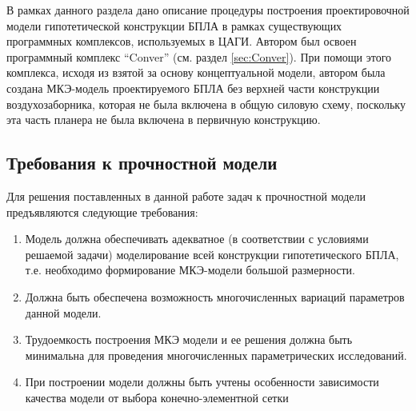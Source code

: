 
В рамках данного раздела дано описание процедуры построения проектировочной модели гипотетической конструкции БПЛА в рамках существующих программных комплексов, используемых в ЦАГИ. Автором был освоен программный комплекс ``Conver'' \cite{Conver} (см. раздел \ref{sec:Conver}). 
При помощи этого комплекса, исходя из взятой за основу концептуальной модели, автором была создана МКЭ-модель проектируемого БПЛА без верхней части конструкции воздухозаборника, которая не была включена в общую силовую схему, поскольку эта часть планера не была включена в первичную конструкцию.




\subsection{Требования к прочностной модели}

Для решения поставленных в данной работе задач к прочностной модели предъявляются следующие требования:



\begin{enumerate}
\item Модель должна обеспечивать адекватное (в соответствии с условиями решаемой задачи) моделирование всей конструкции гипотетического БПЛА, т.е. необходимо формирование МКЭ-модели большой размерности.
\item Должна быть обеспечена возможность многочисленных вариаций параметров данной модели.
\item Трудоемкость построения МКЭ модели и ее решения должна быть минимальна для проведения многочисленных параметрических исследований.
\item При построении модели должны быть учтены особенности зависимости качества модели от выбора конечно-элементной сетки
\end{enumerate}

